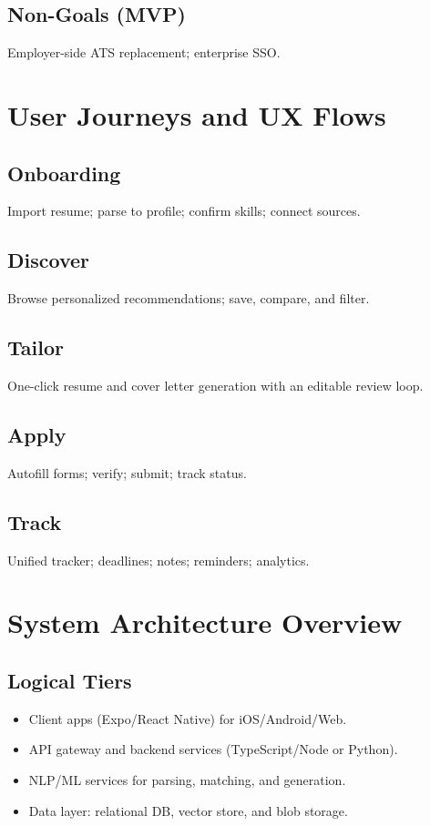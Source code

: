 \documentclass[12pt,a4paper]{article}
\begin{document}
\subsection{Non-Goals (MVP)}
Employer-side ATS replacement; enterprise SSO.

\section{User Journeys and UX Flows}
\subsection{Onboarding}
Import resume; parse to profile; confirm skills; connect sources.
\subsection{Discover}
Browse personalized recommendations; save, compare, and filter.
\subsection{Tailor}
One-click resume and cover letter generation with an editable review loop.
\subsection{Apply}
Autofill forms; verify; submit; track status.
\subsection{Track}
Unified tracker; deadlines; notes; reminders; analytics.

\section{System Architecture Overview}
\subsection{Logical Tiers}
\begin{itemize}[leftmargin=2em]
  \item Client apps (Expo/React Native) for iOS/Android/Web.
  \item API gateway and backend services (TypeScript/Node or Python).
  \item NLP/ML services for parsing, matching, and generation.
  \item Data layer: relational DB, vector store, and blob storage.
\end{itemize}
\end{document}
